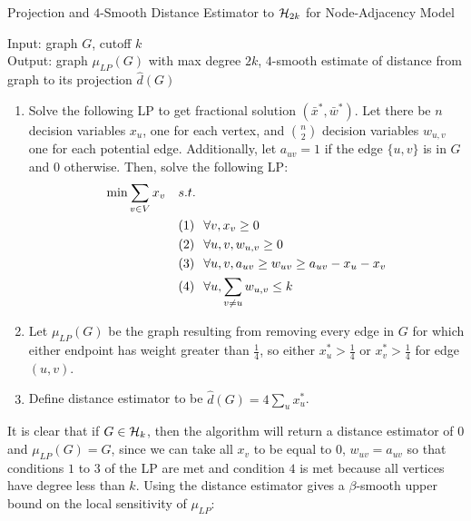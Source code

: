 \begin{algorithm}[!ht]
	\caption{Projection and $4$-Smooth Distance Estimator to $\mathcal{H}_{2k}$ for Node-Adjacency Model \cite{BBDS13}}
	Input: graph $G$, cutoff $k$ \\
	Output: graph $\mu_{LP}(G)$ with max degree $2k$, $4$-smooth estimate of distance from graph to its projection $\hat{d}(G)$
	
	\vspace{0.1in}
	\begin{enumerate}
		\item  Solve the following LP to get fractional solution $(\bar{x}^*, \bar{w}^*)$. Let there be $n$ decision variables $x_u$, one for each vertex, and $\binom{n}{2}$ decision variables $w_{u,v}$ one for each potential edge. Additionally, let $a_{uv} = 1$ if the edge $\{u, v\}$ is in $G$ and $0$ otherwise. Then, solve the following LP:
		\begin{align*}
		\min \sum_{v \in V} x_v  \quad & s.t. \\
		& (1) \hspace{0.1in} \forall v, x_v \geq 0 \\
		& (2) \hspace{0.1in} \forall u,v, w_{u,v} \geq 0 \\
		& (3) \hspace{0.1in} \forall u,v, a_{uv} \geq w_{uv} \geq a_{uv} - x_u - x_v \\
		& (4) \hspace{0.1in} \forall u, \sum_{v \not = u} w_{u,v} \leq k \\
		\end{align*}
		
		\item Let $\mu_{LP}(G)$ be the graph resulting from removing every edge in $G$ for which either endpoint has weight greater than $\frac{1}{4}$, so either $x_u^* > \frac{1}{4}$ or $x_v^* > \frac{1}{4}$ for edge $(u,v)$.
		
		\item Define distance estimator to be $\hat{d}(G) = 4 \sum_u x^*_u$.
	\end{enumerate}
\end{algorithm}

It is clear that if $G \in \mathcal{H}_k$, then the algorithm will return a distance estimator of $0$ and $\mu_{LP}(G) = G$, since we can take all $x_v$ to be equal to $0$, $w_{uv} = a_{uv}$ so that conditions $1$ to $3$ of the LP are met and condition $4$ is met because all vertices have degree less than $k$. Using the distance estimator gives a $\beta$-smooth upper bound on the local sensitivity of $\mu_{LP}$: 

